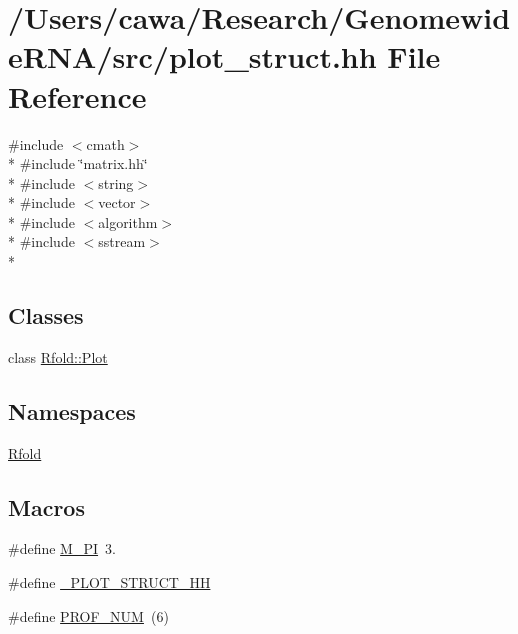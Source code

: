 \hypertarget{plot__struct_8hh}{\section{/\+Users/cawa/\+Research/\+Genomewide\+R\+N\+A/src/plot\+\_\+struct.hh File Reference}
\label{plot__struct_8hh}
}
{\ttfamily \#include $<$cmath$>$}\\*
{\ttfamily \#include \char`\"{}matrix.\+hh\char`\"{}}\\*
{\ttfamily \#include $<$string$>$}\\*
{\ttfamily \#include $<$vector$>$}\\*
{\ttfamily \#include $<$algorithm$>$}\\*
{\ttfamily \#include $<$sstream$>$}\\*
\subsection*{Classes}
\begin{DoxyCompactItemize}
\item 
class \hyperlink{class_rfold_1_1_plot}{Rfold\+::\+Plot}
\end{DoxyCompactItemize}
\subsection*{Namespaces}
\begin{DoxyCompactItemize}
\item 
 \hyperlink{namespace_rfold}{Rfold}
\end{DoxyCompactItemize}
\subsection*{Macros}
\begin{DoxyCompactItemize}
\item 
\#define \hyperlink{plot__struct_8hh_ae71449b1cc6e6250b91f539153a7a0d3}{M\+\_\+\+P\+I}~3.
\item 
\#define \hyperlink{plot__struct_8hh_afe4893d33e9cf48f7d08ced2701141a8}{\+\_\+\+P\+L\+O\+T\+\_\+\+S\+T\+R\+U\+C\+T\+\_\+\+H\+H}
\item 
\#define \hyperlink{plot__struct_8hh_a2157e7b8a768152a4baebc430cdbe941}{P\+R\+O\+F\+\_\+\+N\+U\+M}~(6)
\end{DoxyCompactItemize}


